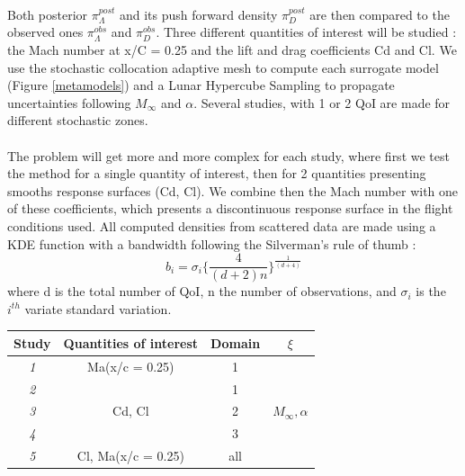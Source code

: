\documentclass[11pt, a4paper, English]{report}
\begin{document}
\\\\\\
Both posterior $\pi_\Lambda^{post}$ and its push forward density $\pi_D^{post}$ are then compared to the observed ones $\pi_\Lambda^{obs}$ and $\pi_D^{obs}$.
Three different quantities of interest will be studied : the Mach number at x/C = 0.25 and the lift and drag coefficients Cd and Cl. We use the stochastic collocation adaptive mesh to compute each surrogate model (Figure \ref{metamodels}) and a Lunar Hypercube Sampling to propagate uncertainties following $M_\infty$ and $\alpha$. Several studies, with 1 or 2 QoI are made for different stochastic zones. \\\\
The problem will get more and more complex for each study, where first we test the method for a single quantity of interest, then for 2 quantities presenting smooths response surfaces (Cd, Cl). We combine then the Mach number with one of these coefficients, which presents a discontinuous response surface in the flight conditions used. %
All computed densities from scattered data are made using a KDE function with a bandwidth following  the Silverman's rule of thumb \cite{Silverman} :
$$ b_i = \sigma_i\{\frac{4}{(d+2)n}\}^{\frac{1}{(d+4)}}
 $$
 where d is the total number of QoI, n the number of observations, and $\sigma_i$ is the $i^{th}$ variate standard variation.
\begin{table}[h!]
\centering
\begin{tabular}{|c|c|c|c|}

\hline
\textbf{Study} & \textbf{Quantities of interest} & \textbf{Domain} & \textbf{$\xi$}                      \\ \hline
\textit{1}     & Ma(x/c = 0.25)                  & 1                     & \multirow{5}{*}{$M_\infty, \alpha$} \\ \cline{1-3}
\textit{2}     & \multirow{3}{*}{Cd, Cl}         & 1                     &                                     \\ \cline{1-1} \cline{3-3}
\textit{3}     &                                 & 2                     &                                     \\ \cline{1-1} \cline{3-3}
\textit{4}     &                                 & 3                     &                                     \\ \cline{1-3}
\textit{5}     & Cl, Ma(x/c = 0.25)              & all                     &                                     \\ \hline
\end{tabular}
\end{table}
\end{document}
